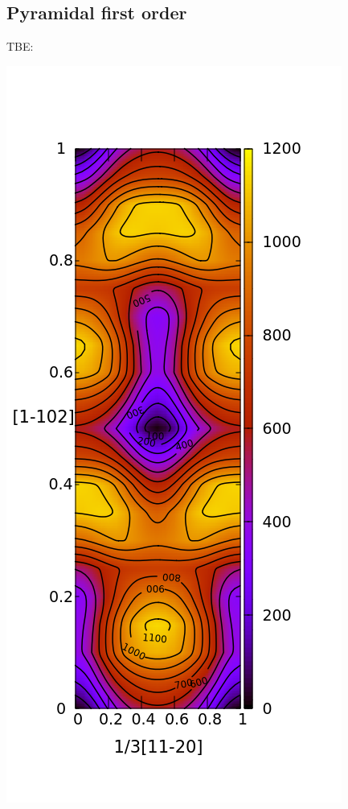 \documentclass[11pt]{article}
\begin{document}
\subsection{Pyramidal first order}
\label{sec:orgde866f4}

TBE:
\begin{center}
\includegraphics[width=.9\linewidth]{Images/pyramidal_gamma_surface_final_model_contours.png}
\end{center}
\end{document}
